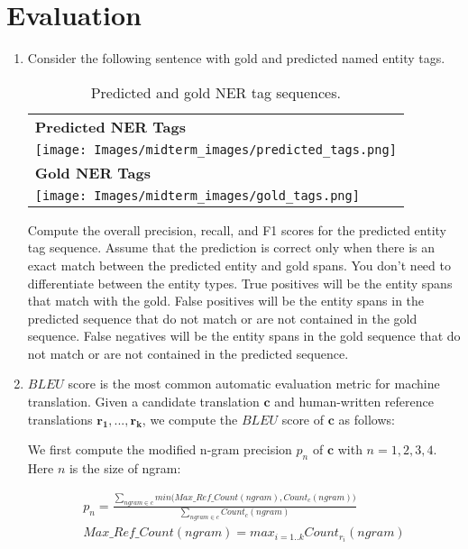 \documentclass[12pt, letterpaper]{article}
\begin{document}
\section{Evaluation}

\begin{enumerate}

    \item Consider the following sentence with gold and predicted named entity tags.
    
    
    \begin{table}[h!]
    \begin{center}
    \small
    \begin{tabular}{l} 
    \hline
    \textbf{Predicted NER Tags} \\
    \texttt{[image: Images/midterm\_images/predicted\_tags.png]}
    \\
    \hline
    \textbf{Gold NER Tags} \\
    \texttt{[image: Images/midterm\_images/gold\_tags.png]}
    \\
    \hline
    \end{tabular}
    \caption{Predicted and gold NER tag sequences.}
    \end{center}
    \end{table}

    
    Compute the overall precision, recall, and F1 scores for the predicted entity tag sequence. Assume that the prediction is correct only when there is an exact match between the predicted entity and gold spans. You don't need to differentiate between the entity types. True positives will be the entity spans that match with the gold. False positives will be the entity spans in the predicted sequence that do not match or are not contained in the gold sequence. False negatives will be the entity spans in the gold sequence that do not match or are not contained in the predicted sequence.

    \item 
    
    $BLEU$ score is the most common automatic evaluation metric for machine translation. Given a candidate translation $\mathbf{c}$ and human-written reference translations $\mathbf{r_1}, . . . , \mathbf{r_k}$, we compute the $BLEU$ score of $\mathbf{c}$ as follows:
    
    We first compute the modified n-gram precision $p_n$ of $\mathbf{c}$ with $n = 1,2,3,4$. Here $n$ is the size of ngram:
    
    \begin{align*}
        p_n = \frac{\sum_{ngram \in c} min \Big( Max\_Ref\_Count(ngram), Count_{c}(ngram) \Big) }{\sum_{ngram \in c} Count_{c}(ngram)} \\
        Max\_Ref\_Count(ngram) = max_{i=1..k} Count_{r_i}(ngram) 
    \end{align*}
    

\end{enumerate}
\end{document}
